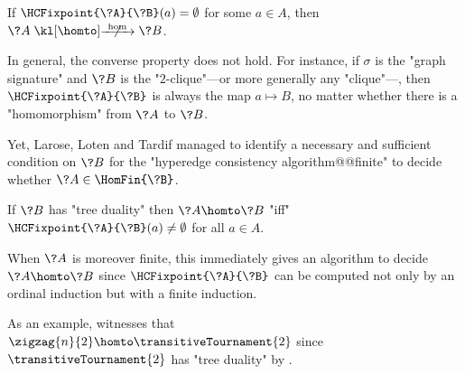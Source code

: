 \begin{corollary}
	\AP\label{coro:HC-empty-implies-no-hom}
	If $\HCFixpoint{\?A}{\?B}(a) = \emptyset$ for some $a\in A$, then
	$\?A \nothomto \?B$.
\end{corollary}

In general, the converse property does not hold. For instance, if $\sigma$ is the
"graph signature" and $\?B$ is the "$2$-clique"---or more generally any "clique"---, then $\HCFixpoint{\?A}{\?B}$
is always the map $a \mapsto B$, no matter whether there is a "homomorphism" from
$\?A$ to $\?B$.

Yet, Larose, Loten and Tardif managed to identify a necessary and sufficient condition on $\?B$ for
the "hyperedge consistency algorithm@@finite" to decide whether $\?A \in \HomFin{\?B}$.

\begin{proposition}
	\AP\label{prop:hyperedge-consistency-tree-duality}
	If $\?B$ has "tree duality" then $\?A \homto \?B$ "iff"
	$\HCFixpoint{\?A}{\?B}(a) \neq \emptyset$ for all $a\in A$.
\end{proposition}

When $\?A$ is moreover finite, this immediately gives an algorithm to decide
$\?A \homto \?B$ since $\HCFixpoint{\?A}{\?B}$ can be computed not only
by an ordinal induction but with a finite induction.

As an example,  witnesses that
$\zigzag{n}{2} \homto \transitiveTournament{2}$ since $\transitiveTournament{2}$
has "tree duality" by .

